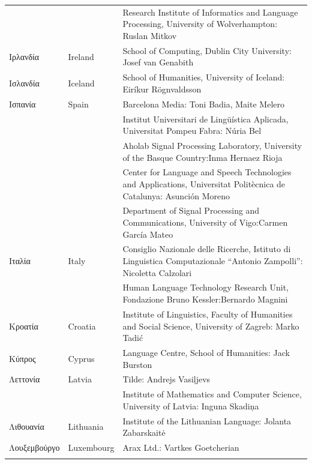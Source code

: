 \begin{longtable}{@{}llp{113mm}@{}}
  & & Research Institute of Informatics and Language Processing, University of Wolverhampton: Ruslan Mitkov \\ \addlinespace 
  Ιρλανδία & \textcolor{grey1}{Ireland} & School of Computing, Dublin City University: Josef van Genabith\\ \addlinespace
  Ισλανδία & \textcolor{grey1}{Iceland} & School of Humanities, University of Iceland: Eiríkur Rögnvaldsson\\ \addlinespace
  Ισπανία & \textcolor{grey1}{Spain} & Barcelona Media: Toni Badia, Maite Melero \\ \addlinespace 
  & & Institut Universitari de Lingüística Aplicada, Universitat Pompeu Fabra: Núria Bel \\ \addlinespace 
  & & Aholab Signal Processing Laboratory, University of the Basque Country:\newline Inma Hernaez Rioja \\ \addlinespace 
  & & Center for Language and Speech Technologies and Applications, Universitat Politècnica de Catalunya:  Asunción Moreno \\ \addlinespace 
  & & Department of Signal Processing and Communications, University of Vigo:\newline Carmen García Mateo \\ \addlinespace 
  Ιταλία & \textcolor{grey1}{Italy} & Consiglio Nazionale delle Ricerche, Istituto di Linguistica Computazionale “Antonio Zampolli”: Nicoletta Calzolari\\ \addlinespace
  & & Human Language Technology Research Unit, Fondazione Bruno Kessler:\newline Bernardo Magnini\\ \addlinespace 
  Κροατία & \textcolor{grey1}{Croatia} & Institute of Linguistics, Faculty of Humanities and Social Science, University of Zagreb: Marko Tadić \\ \addlinespace
  Κύπρος & \textcolor{grey1}{Cyprus} & Language Centre, School of Humanities: Jack Burston\\ \addlinespace
  Λεττονία & \textcolor{grey1}{Latvia} & Tilde: Andrejs Vasiļjevs\\ \addlinespace 
  & & Institute of Mathematics and Computer Science, University of Latvia: Inguna Skadiņa\\ \addlinespace
  Λιθουανία & \textcolor{grey1}{Lithuania} & Institute of the Lithuanian Language: Jolanta Zabarskaitė\\ \addlinespace
  Λουξεμβούργο & \textcolor{grey1}{Luxembourg} & Arax Ltd.: Vartkes Goetcherian\\ \addlinespace

\end{longtable}
